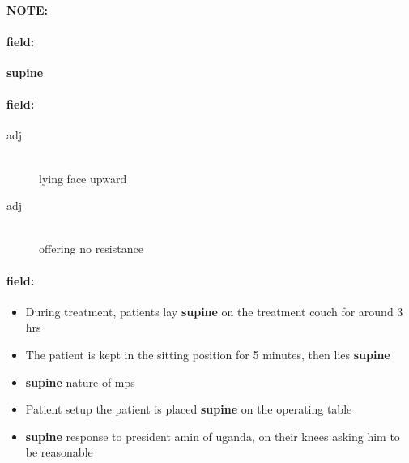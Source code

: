 \documentclass[12pt]{article}
\newenvironment{note}{\paragraph{NOTE:}}{}
\newenvironment{field}{\paragraph{field:}}{}
\begin{document}
\begin{note}
\begin{field}
\textbf{\large supine}
\end{field}


\begin{field}
\begin{description}
\item[adj] \hfill \\ 
lying face upward

\item[adj] \hfill \\ 
offering no resistance

\end{description}
\end{field}

\begin{field}
\begin{itemize}
\item During treatment, patients lay \textbf{supine} on the treatment couch for around 3 hrs
\item The patient is kept in the sitting position for 5 minutes, then lies \textbf{supine}
\item \textbf{supine} nature of mps
\item Patient setup the patient is placed \textbf{supine} on the operating table
\item \textbf{supine} response to president amin of uganda, on their knees asking him to be reasonable
\end{itemize}
\end{field}
\end{note}
\end{document}

